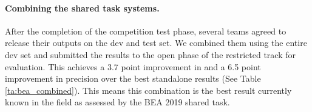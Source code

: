 \documentclass[11pt,a4paper]{article}
\begin{document}
\begin{table}[htb]
\caption{Combining fares better compared to ensemble.}  \label{ta:merge_vs_ensemble}
\end{table}

\paragraph{Combining the shared task systems.}
After the completion of the competition test phase, several teams agreed to release their outputs on the dev and test set. We combined them using the entire dev set and submitted the results to the open phase of the restricted track for evaluation.  This achieves a 3.7 point improvement in  and a 6.5 point improvement in precision over the best standalone results (See Table \ref{ta:bea_combined}). This means this combination is the best result currently known in the field as assessed by the BEA 2019 shared task.

\begin{table}[htb]
\caption{Test set results when combining systems from the competition used as black boxes. The combination is the new state of the art.  \label{ta:bea_combined}}
\end{table}
\end{document}
